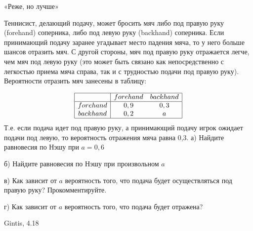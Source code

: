 \begin{problem}
 «Реже, но лучше» \par
Теннисист, делающий подачу, может бросить мяч либо под правую руку (forehand) соперника, либо под левую руку (backhand) соперника. Если принимающий подачу заранее угадывает место падения мяча, то у него больше шансов отразить мяч. С другой стороны, мяч под правую руку отражается легче, чем мяч под левую руку (это может быть связано как непосредственно с легкостью приема мяча справа, так и с трудностью подачи под правую руку). Вероятности отразить мяч занесены в таблицу:\par
\[\begin{array}{|c|cc|}
\hline
{} & {forehand} & {backhand} \\
\hline {forehand} & {0,9} & {0,3} \\
{backhand} & {0,2} & {a} \\
\hline
\end{array}\]
Т.е. если подача идет под правую руку, а принимающий подачу игрок ожидает подачи под левую, то вероятность отражения мяча равна 0,3.
а) Найдите равновесия по Нэшу при  $a=0,6$\par
б) Найдите равновесия по Нэшу при произвольном  $a$\par
в) Как зависит от  $a$  вероятность того, что подача будет осуществляться под правую руку? Прокомментируйте.\par
г) Как зависит от  $a$  вероятность того, что подача будет отражена?\par



\begin{sol}

\end{sol}
\end{problem}


\begin{source}
Gintis, 4.18
\end{source}



